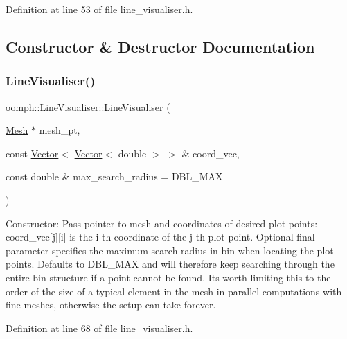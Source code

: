 Definition at line 53 of file line\+\_\+visualiser.\+h.



\subsection{Constructor \& Destructor Documentation}
\mbox{\label{classoomph_1_1LineVisualiser_a4b309f24ea1bd65b6d4324ca564f3b0d}} 
\subsubsection{\texorpdfstring{Line\+Visualiser()}{LineVisualiser()}\hspace{0.1cm}{\footnotesize\ttfamily [1/3]}}
{\footnotesize\ttfamily oomph\+::\+Line\+Visualiser\+::\+Line\+Visualiser (\begin{DoxyParamCaption}\item[{\hyperlink{classoomph_1_1Mesh}{Mesh} $\ast$}]{mesh\+\_\+pt,  }\item[{const \hyperlink{classoomph_1_1Vector}{Vector}$<$ \hyperlink{classoomph_1_1Vector}{Vector}$<$ double $>$ $>$ \&}]{coord\+\_\+vec,  }\item[{const double \&}]{max\+\_\+search\+\_\+radius = {\ttfamily DBL\+\_\+MAX} }\end{DoxyParamCaption})\hspace{0.3cm}{\ttfamily [inline]}}



Constructor\+: Pass pointer to mesh and coordinates of desired plot points\+: coord\+\_\+vec\mbox{[}j\mbox{]}\mbox{[}i\mbox{]} is the i-\/th coordinate of the j-\/th plot point. Optional final parameter specifies the maximum search radius in bin when locating the plot points. Defaults to D\+B\+L\+\_\+\+M\+AX and will therefore keep searching through the entire bin structure if a point cannot be found. It\textquotesingle{}s worth limiting this to the order of the size of a typical element in the mesh in parallel computations with fine meshes, otherwise the setup can take forever. 



Definition at line 68 of file line\+\_\+visualiser.\+h.



